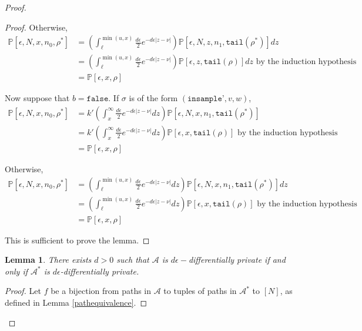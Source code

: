 \documentclass[12pt]{article}
\newcommand{\PP}{\mathbb{P}}
\newtheorem{lemma}[thm]{Lemma}
\theoremstyle{definition}
\begin{document}
\begin{proof}
\begin{proof}
	Otherwise, 
	\begin{align*}
		\PP[\epsilon, N, x, n_0, \rho^*] &= \left(\int_{\ell}^{\min(u, x)}\frac{d\epsilon}{2}e^{-d\epsilon|z-\nu|}\right)\PP[\epsilon, N, z, n_1, \texttt{tail}(\rho^*)]dz \\
		&= \left(\int_{\ell}^{\min(u, x)}\frac{d\epsilon}{2}e^{-d\epsilon|z-\nu|}\right)\PP[\epsilon, z, \texttt{tail}(\rho)]dz \text{ by the induction hypothesis }\\
		&= \PP[\epsilon, x, \rho]
	\end{align*}

	Now suppose that $b = \texttt{false}$. If $\sigma$ is of the form $(\texttt{insample'}, v, w)$, 
	\begin{align*}
		\PP[\epsilon, N, x, n_0, \rho^*] &= k'\left(\int_x^\infty\frac{d\epsilon}{2}e^{-d\epsilon|z-\nu|}dz\right)\PP[\epsilon, N, x, n_1, \texttt{tail}(\rho^*)]\\
		&= k'\left(\int_x^\infty\frac{d\epsilon}{2}e^{-d\epsilon|z-\nu|}dz\right)\PP[\epsilon, x, \texttt{tail}(\rho)] \text{ by the induction hypothesis }\\
		&= \PP[\epsilon, x, \rho]
	\end{align*}

	Otherwise, 
	\begin{align*}
		\PP[\epsilon, N, x, n_0, \rho^*] &= \left(\int_{\ell}^{\min(u, x)}\frac{d\epsilon}{2}e^{-d\epsilon|z-\nu|}dz\right)\PP[\epsilon, N, x, n_1, \texttt{tail}(\rho^*)]dz \\
		&= \left(\int_{\ell}^{\min(u, x)}\frac{d\epsilon}{2}e^{-d\epsilon|z-\nu|}dz\right)\PP[\epsilon, x, \texttt{tail}(\rho)] \text{ by the induction hypothesis }\\
		&= \PP[\epsilon, x, \rho]
	\end{align*}

	This is sufficient to prove the lemma. 
	
\end{proof}

\begin{lemma}\label{dpequiv}
	There exists $d > 0$ such that $\mathcal{A}$ is $d\epsilon-$differentially private if and only if $\mathcal{A}^*$ is $d\epsilon$-differentially private.
\end{lemma}

\begin{proof}
	Let $f$ be a bijection from paths in $\mathcal{A}$ to tuples of paths in $\mathcal{A}^*$ to $[N]$, as defined in Lemma \ref{pathequivalence}.


\end{proof}
\end{proof}
\end{document}
